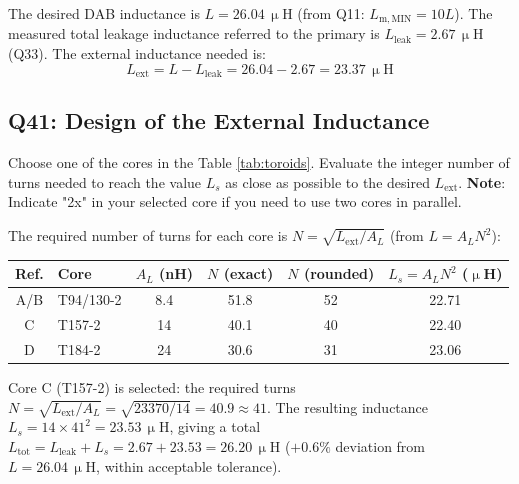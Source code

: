 \documentclass{PELsmallreport}
\begin{document}
\begin{framed}
The desired DAB inductance is $L = 26.04\,\upmu\mathrm{H}$ (from Q11: $L_\mathrm{m,MIN} = 10L$). The measured total leakage inductance referred to the primary is $L_\mathrm{leak} = 2.67\,\upmu\mathrm{H}$ (Q33). The external inductance needed is:
\begin{equation}
    L_\mathrm{ext} = L - L_\mathrm{leak} = 26.04 - 2.67 = 23.37\,\upmu\mathrm{H}
\end{equation}
\end{framed}

 \hfill{}









\subsection{Q41: Design of the External Inductance} 
Choose one of the cores in the Table \ref{tab:toroids}. 
Evaluate the integer number of turns needed to reach the value $L_s$ as close as possible to the desired $L_\mathrm{ext}$.
\textbf{Note}: Indicate "2x" in your selected core if you need to use two cores in parallel.  
\\

\begin{framed}
The required number of turns for each core is $N = \sqrt{L_\mathrm{ext}/A_L}$ (from $L = A_L N^2$):
\begin{center}\begin{tabular}{clcccc}\toprule
Ref. & Core & $A_L$ (nH) & $N$ (exact) & $N$ (rounded) & $L_s = A_L N^2$ ($\upmu$H) \\\midrule
A/B & T94/130-2 & 8.4 & 51.8 & 52 & 22.71 \\
C   & T157-2    & 14  & 40.1 & 40 & 22.40 \\
D   & T184-2    & 24  & 30.6 & 31 & 23.06 \\\bottomrule
\end{tabular}\end{center}
Core C (T157-2) is selected: the required turns $N = \sqrt{L_\mathrm{ext}/A_L} = \sqrt{23370/14} = 40.9 \approx 41$. The resulting inductance $L_s = 14\times41^2 = 23.53\,\upmu\mathrm{H}$, giving a total $L_\mathrm{tot} = L_\mathrm{leak} + L_s = 2.67 + 23.53 = 26.20\,\upmu\mathrm{H}$ ($+0.6\%$ deviation from $L = 26.04\,\upmu\mathrm{H}$, within acceptable tolerance).
\end{framed}
\end{document}
